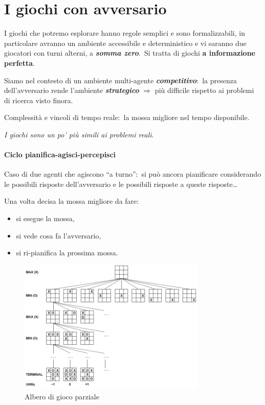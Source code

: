 \chapter{I giochi con avversario}

I giochi che potremo esplorare hanno regole semplici e sono formalizzabili, in particolare avranno un ambiente accessibile e deterministico e vi saranno due giocatori con turni alterni, a \textbf{\textit{somma zero}}.\
Si tratta di giochi \textbf{a informazione perfetta}.

Siamo nel contesto di un ambiente multi-agente \textbf{\textit{competitivo}}:\ la presenza dell'avversario rende l'ambiente \textbf{\textit{strategico}} $\Rightarrow$ più difficile rispetto ai problemi di ricerca visto finora.\

Complessità e vincoli di tempo reale:\ la mossa migliore nel tempo disponibile.

\begin{center}
	\textit{I giochi sono un po' più simili ai problemi reali}.
\end{center}

\subsubsection{Ciclo pianifica-agisci-percepisci}

Caso di due agenti che agiscono ``a turno'':\ si può ancora pianificare considerando le possibili risposte dell'avversario e le possibili risposte a queste risposte\dots\

\noindent Una volta decisa la mossa migliore da fare:
\begin{itemize}
	\item si esegue la mossa,
	\item si vede cosa fa l'avversario,
	\item si ri-pianifica la prossima mossa.
\end{itemize}

\begin{figure}[H]
	\centering
	\includegraphics[width=0.8\textwidth]{immagini/TicTacToe.png}
	\caption*{Albero di gioco parziale}
\end{figure}

